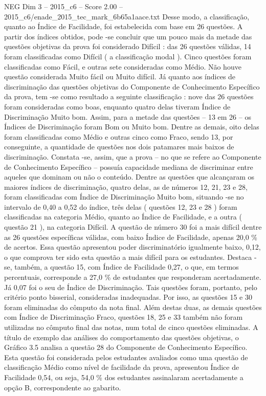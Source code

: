\begin{textsample}{NEG Dim 3 – 2015\_c6 – Score 2.00 – 2015\_c6/enade\_2015\_tec\_mark\_6b65a1aace.txt}
Desse modo, a classificação, quanto ao Índice de Facilidade, foi estabelecida com base em 26 questões.
A partir dos índices obtidos, pode -se concluir que um pouco mais da metade das questões objetivas da prova foi considerado Difícil : das 26 questões válidas, 14 foram classificadas como Difícil ( a classificação modal ).
Cinco questões foram classificadas como Fácil, e outras sete consideradas como Médio.
Não houve questão considerada Muito fácil ou Muito difícil.
Já quanto aos índices de discriminação das questões objetivas do Componente de Conhecimento Específico da prova, tem -se como resultado a seguinte classificação : nove das 26 questões foram consideradas como boas, enquanto quatro delas tiveram Índice de Discriminação Muito bom.
Assim, para a metade das questões – 13 em 26 – os Índices de Discriminação foram Bom ou Muito bom.
Dentre as demais, oito delas foram classificadas como Médio e outras cinco como Fraco, sendo 13, por conseguinte, a quantidade de questões nos dois patamares mais baixos de discriminação.
Constata -se, assim, que a prova – no que se refere ao Componente de Conhecimento Específico – possuía capacidade mediana de discriminar entre aqueles que dominam ou não o conteúdo.
Dentre as questões que alcançaram os maiores índices de discriminação, quatro delas, as de números 12, 21, 23 e 28, foram classificadas com Índice de Discriminação Muito bom, situando -se no intervalo de 0,40 a 0,52 do índice, três delas ( questões 12, 23 e 28 ) foram classificadas na categoria Médio, quanto ao Índice de Facilidade, e a outra ( questão 21 ), na categoria Difícil.
A questão de número 30 foi a mais difícil dentre as 26 questões específicas válidas, com baixo Índice de Facilidade, apenas 20,0 \% de acertos.
Essa questão apresentou poder discriminatório igualmente baixo, 0,12, o que comprova ter sido esta questão a mais difícil para os estudantes.
Destaca -se, também, a questão 15, com Índice de Facilidade 0,27, o que, em termos percentuais, corresponde a 27,0 \% de estudantes que responderam acertadamente.
Já 0,07 foi o seu de Índice de Discriminação.
Tais questões foram, portanto, pelo critério ponto bisserial, consideradas inadequadas.
Por isso, as questões 15 e 30 foram eliminadas do cômputo da nota final.
Além destas duas, as demais questões com Índice de Discriminação Fraco, questões 18, 25 e 33 também não foram utilizadas no cômputo final das notas, num total de cinco questões eliminadas.
A título de exemplo das análises do comportamento das questões objetivas, o Gráfico 3.5 analisa a questão 28 do Componente de Conhecimento Específico.
Esta questão foi considerada pelos estudantes avaliados como uma questão de classificação Médio como nível de facilidade da prova, apresentou Índice de Facilidade 0,54, ou seja, 54,0 \% dos estudantes assinalaram acertadamente a opção B, correspondente ao gabarito.

\end{textsample}
